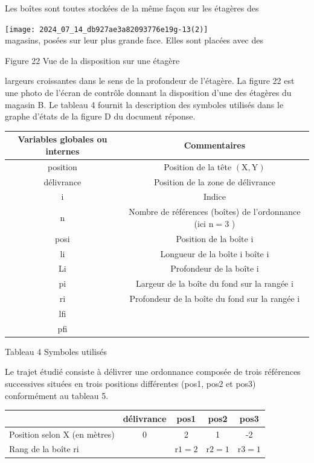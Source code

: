 \documentclass[10pt]{article}
\begin{document}
Les boîtes sont toutes stockées de la même façon sur les étagères des

\texttt{[image: 2024\_07\_14\_db927ae3a82093776e19g-13(2)]}\\
magasins, posées sur leur plus grande face. Elles sont placées avec des

Figure 22 Vue de la disposition sur une étagère

largeurs croissantes dans le sens de la profondeur de l'étagère. La figure 22 est une photo de l'écran de contrôle donnant la disposition d'une des étagères du magasin B. Le tableau 4 fournit la description des symboles utilisés dans le graphe d'états de la figure D du document réponse.

\begin{center}
\begin{tabular}{|c|c|}
\hline
Variables globales ou internes & Commentaires \\
\hline
position & Position de la tête $(\mathrm{X}, \mathrm{Y})$ \\
\hline
délivrance & Position de la zone de délivrance \\
\hline
i & Indice \\
\hline
n & Nombre de références (boîtes) de l'ordonnance (ici $\mathrm{n}=3$ ) \\
\hline
posi & Position de la boîte i \\
\hline
li & Longueur de la boîte i boîte i \\
\hline
Li & Profondeur de la boîte i \\
\hline
pi & Largeur de la boîte du fond sur la rangée i \\
\hline
ri & Profondeur de la boîte du fond sur la rangée i \\
\hline
lfi &  \\
\hline
pfi &  \\
\hline
\end{tabular}
\end{center}

Tableau 4 Symboles utilisés

Le trajet étudié consiste à délivrer une ordonnance composée de trois références successives situées en trois positions différentes (pos1, pos2 et pos3) conformément au tableau 5.

\begin{center}
\begin{tabular}{|l|c|c|c|c|}
\hline
 & délivrance & pos1 & pos2 & pos3 \\
\hline
Position selon X (en mètres) & 0 & 2 & 1 & -2 \\
\hline
Rang de la boîte ri &  & $\mathrm{r} 1=2$ & $\mathrm{r} 2=1$ & $\mathrm{r} 3=1$ \\
\hline
\end{tabular}
\end{center}
\end{document}
